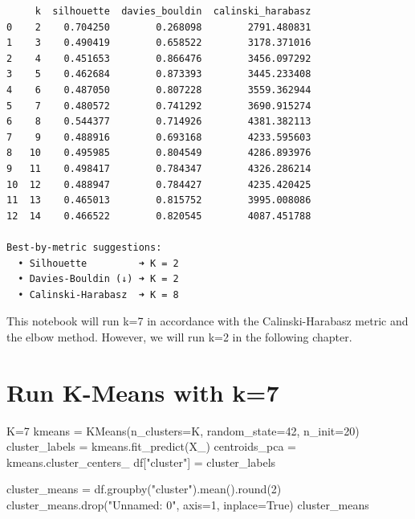 \documentclass[
  letterpaper,
  DIV=11,
  numbers=noendperiod]{scrreprt}
\newenvironment{Shaded}{\begin{snugshade}}{\end{snugshade}}
\newcommand{\BuiltInTok}[1]{\textcolor[rgb]{0.00,0.23,0.31}{#1}}
\newcommand{\DecValTok}[1]{\textcolor[rgb]{0.68,0.00,0.00}{#1}}
\newcommand{\NormalTok}[1]{\textcolor[rgb]{0.00,0.23,0.31}{#1}}
\newcommand{\OperatorTok}[1]{\textcolor[rgb]{0.37,0.37,0.37}{#1}}
\newcommand{\StringTok}[1]{\textcolor[rgb]{0.13,0.47,0.30}{#1}}
\newcommand{\VariableTok}[1]{\textcolor[rgb]{0.07,0.07,0.07}{#1}}
\begin{document}
\begin{verbatim}
     k  silhouette  davies_bouldin  calinski_harabasz
0    2    0.704250        0.268098        2791.480831
1    3    0.490419        0.658522        3178.371016
2    4    0.451653        0.866476        3456.097292
3    5    0.462684        0.873393        3445.233408
4    6    0.487050        0.807228        3559.362944
5    7    0.480572        0.741292        3690.915274
6    8    0.544377        0.714926        4381.382113
7    9    0.488916        0.693168        4233.595603
8   10    0.495985        0.804549        4286.893976
9   11    0.498417        0.784347        4326.286214
10  12    0.488947        0.784427        4235.420425
11  13    0.465013        0.815752        3995.008086
12  14    0.466522        0.820545        4087.451788

Best-by-metric suggestions:
  • Silhouette         ➜ K = 2
  • Davies-Bouldin (↓) ➜ K = 2
  • Calinski-Harabasz  ➜ K = 8
\end{verbatim}

This notebook will run k=7 in accordance with the Calinski-Harabasz
metric and the elbow method. However, we will run k=2 in the following
chapter.

\section{Run K-Means with k=7}\label{run-k-means-with-k7}

\begin{Shaded}
\begin{Highlighting}[]
\NormalTok{K}\OperatorTok{=}\DecValTok{7}
\NormalTok{kmeans }\OperatorTok{=}\NormalTok{ KMeans(n\_clusters}\OperatorTok{=}\NormalTok{K, random\_state}\OperatorTok{=}\DecValTok{42}\NormalTok{, n\_init}\OperatorTok{=}\DecValTok{20}\NormalTok{)}
\NormalTok{cluster\_labels }\OperatorTok{=}\NormalTok{ kmeans.fit\_predict(X\_)}
\NormalTok{centroids\_pca }\OperatorTok{=}\NormalTok{ kmeans.cluster\_centers\_ }
\NormalTok{df[}\StringTok{"cluster"}\NormalTok{] }\OperatorTok{=}\NormalTok{ cluster\_labels}
\end{Highlighting}
\end{Shaded}

\begin{Shaded}
\begin{Highlighting}[]
\NormalTok{cluster\_means }\OperatorTok{=}\NormalTok{ df.groupby(}\StringTok{"cluster"}\NormalTok{).mean().}\BuiltInTok{round}\NormalTok{(}\DecValTok{2}\NormalTok{)}
\NormalTok{cluster\_means.drop(}\StringTok{"Unnamed: 0"}\NormalTok{, axis}\OperatorTok{=}\DecValTok{1}\NormalTok{, inplace}\OperatorTok{=}\VariableTok{True}\NormalTok{)}
\NormalTok{cluster\_means}
\end{Highlighting}
\end{Shaded}
\end{document}

